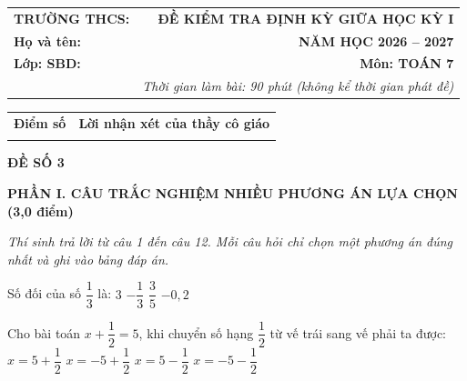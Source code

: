 \documentclass[12pt,a4paper]{article}
\begin{document}
\noindent
\begin{tabularx}{\linewidth}{X r}
\textbf{TRƯỜNG THCS: \dotfill} & \textbf{ĐỀ KIỂM TRA ĐỊNH KỲ GIỮA HỌC KỲ I} \\
\textbf{Họ và tên: \dotfill} & \textbf{NĂM HỌC 2026 -- 2027} \\
\textbf{Lớp: \dotfill \quad SBD: \dotfill} & \textbf{Môn: TOÁN 7} \\
& \textit{Thời gian làm bài: 90 phút (không kể thời gian phát đề)}
\end{tabularx}

\vspace{1.5mm}
\noindent
\begin{tabularx}{\linewidth}{|p{3.5cm}|X|}
\hline
\centering\textbf{Điểm số} & \centering\textbf{Lời nhận xét của thầy cô giáo} \tabularnewline
\rule{0pt}{1.6cm} & \\
\hline
\end{tabularx}

\vspace{2.5mm}
\begin{center}
\textbf{\large ĐỀ SỐ 3}
\end{center}

\noindent\textbf{\large PHẦN I. CÂU TRẮC NGHIỆM NHIỀU PHƯƠNG ÁN LỰA CHỌN (3,0 điểm)}

\textit{Thí sinh trả lời từ câu 1 đến câu 12. Mỗi câu hỏi chỉ chọn một phương án đúng nhất và ghi vào bảng đáp án.}

\vspace{1mm}
\begin{ex}
Số đối của số $\dfrac{1}{3}$ là:
\choice
{$3$}
{\True $-\dfrac{1}{3}$}
{$\dfrac{3}{5}$}
{$-0{,}2$}
\end{ex}

\begin{ex}
\end{ex}

\begin{ex}
Cho bài toán $x + \dfrac{1}{2} = 5$, khi chuyển số hạng $\dfrac{1}{2}$ từ vế trái sang vế phải ta được:
\choice
{$x = 5 + \dfrac{1}{2}$}
{$x = -5 + \dfrac{1}{2}$}
{\True $x = 5 - \dfrac{1}{2}$}
{$x = -5 - \dfrac{1}{2}$}
\end{ex}
\end{document}
